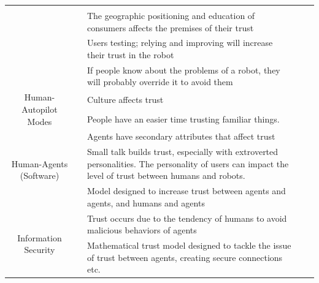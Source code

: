 \documentclass[runningheads,a4paper]{llncs}
\begin{document}
\begin{longtable}{|c|c|p{5cm}|p{3cm}|p{1cm}|}
	&                                 
	&                       
	\\ \cline{2-5} 
	& \cite{kyriakidis2015public}
	& The geographic positioning and education of consumers affects the premises of their trust 
	&                                 
	&                       
	\\ \cline{2-5} 
	& \cite{wagner2015philosophy}    
	& Users testing; relying and improving will increase their trust in the robot 
	&                                 
	&                       
	\\ \cline{2-5} 
	& \cite{helldin2013presenting}
	& If people know about the problems of a robot, they will probably override it to avoid them            
	&                                 
	&                       
	\\ \hline
	
	\multirow{2}{*}{Human-Autopilot Modes}    
	& \cite{winter2015indian}
	& Culture affects trust                        
	&                                 
	&                       
	\\ \cline{2-5} 
	& \cite{butakov2015driving}
	& People have an easier time trusting familiar things.                   
	&                                 
	&                       
	\\ \hline
	
	\multirow{3}{*}{Human-Agents (Software) } 
	& \cite{nwana1996software}
	& Agents have secondary attributes that affect trust                    
	&                                 
	&                       
	\\ \cline{2-5}
	& \cite{bickmore2001relational}
	& Small talk builds trust, especially with extroverted personalities. The personality of users can impact the level of trust between humans and robots.
	&                                 
	&                       
	\\ \cline{2-5} 
	& \cite{abdul2000supporting}
	& Model designed to increase trust between agents and agents, and humans and agents                     
	&                                 
	&                       
	\\ \hline
	
	\multirow{2}{*}{Information Security } 
	& \cite{josang1998modelling}
	& Trust occurs due to the tendency of humans to avoid malicious behaviors of agents                   
	&                                 
	&                       
	\\ \cline{2-5} 
	& \cite{almenarez2006developing}
	& Mathematical trust model designed to tackle the issue of trust between agents, creating secure connections etc.    
	&                                 
	&                       
	\\ \hline
	

\end{longtable}
\end{document}
